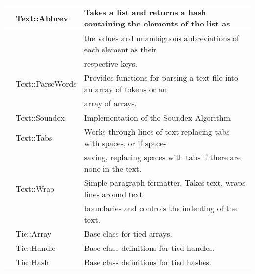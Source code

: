 \documentclass[a4paper,11pt]{book}
\begin{document}
\begin{tabular}{|p{0.2in}|p{1.0in}|p{2.9in}|}
 & Text::Abbrev & Takes a list and returns a hash containing the elements of the list as \\ \hline 
 &  & the values and unambiguous abbreviations of each element as their \\ \hline 
 &  & respective keys. \\ \hline 
 & Text::ParseWords & Provides functions for parsing a text file into an array of tokens or an \\ \hline 
 &  & array of arrays. \\ \hline 
 & Text::Soundex & Implementation of the Soundex Algorithm. \\ \hline 
 & Text::Tabs & Works through lines of text replacing tabs with spaces, or if space- \\ \hline 
 &  & saving, replacing spaces with tabs if there are none in the text. \\ \hline 
 & Text::Wrap & Simple paragraph formatter. Takes text, wraps lines around text \\ \hline 
 &  & boundaries and controls the indenting of the text. \\ \hline 
 & Tie::Array & Base class for tied arrays. \\ \hline 
 & Tie::Handle & Base class definitions for tied handles. \\ \hline 
 & Tie::Hash & Base class definitions for tied hashes. \\ \hline 
\end{tabular}



\noindent 
\end{document}
